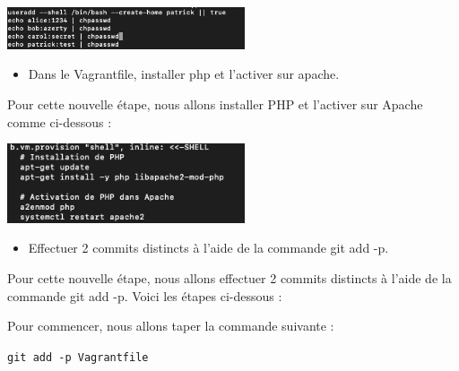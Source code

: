 \documentclass[12pt]{article}
\begin{document}
\vspace{0.3cm}

\begin{center}
  \includegraphics[width=7cm]{Images-TD-Git/Image-TD-Git-2/ajout-patrick-vagrant.png}
\end{center}

\vspace{0.3cm}

\begin{itemize}
  \item Dans le Vagrantfile, installer php et l'activer sur apache.
\end{itemize}

\vspace{0.3cm}

Pour cette nouvelle étape, nous allons installer PHP et l'activer sur Apache comme ci-dessous :

\vspace{0.3cm}

\begin{center}
  \includegraphics[width=7cm]{Images-TD-Git/Image-TD-Git-2/php-apache.png}
\end{center}

\vspace{0.3cm}

\begin{itemize}
  \item Effectuer 2 commits distincts à l'aide de la commande git add -p.
\end{itemize}

\vspace{0.3cm}

Pour cette nouvelle étape, nous allons effectuer 2 commits distincts à l'aide de la commande git add -p. Voici les étapes ci-dessous :

\vspace{0.3cm}

Pour commencer, nous allons taper la commande suivante :

\texttt{git add -p Vagrantfile}
\end{document}
